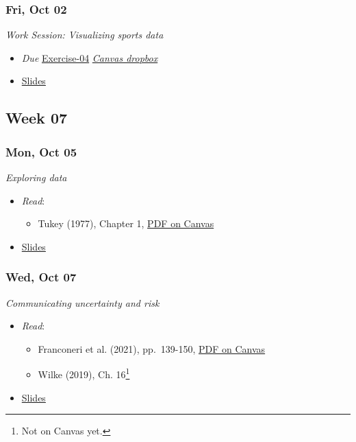 \documentclass[
  letterpaper,
  DIV=11,
  numbers=noendperiod]{scrartcl}
\providecommand{\tightlist}{%
  \setlength{\itemsep}{0pt}\setlength{\parskip}{0pt}}
\begin{document}
\subsubsection*{Fri, Oct 02}\label{fri-oct-02}

\emph{Work Session: Visualizing sports data}

\begin{itemize}
\tightlist
\item
   \emph{Due}
  \href{exercises/ex-04-making-figs-ggplot.qmd}{Exercise-04} \textbar{}
  \href{https://psu.instructure.com/courses/2484925/assignments/18448438}{
  \emph{Canvas dropbox}} \textbar{}
\item
  \href{404.qmd}{Slides}
\end{itemize}

\subsection*{Week 07}\label{week-07}

\subsubsection*{Mon, Oct 05}\label{mon-oct-05}

\emph{Exploring data}

\begin{itemize}
\tightlist
\item
  \emph{Read}:

  \begin{itemize}
  \tightlist
  \item
    Tukey (1977), Chapter 1,
    \href{https://psu.instructure.com/courses/2484925/files?preview=193922548}{PDF
    on Canvas}
  \end{itemize}
\item
  \href{404.qmd}{Slides}
\end{itemize}

\subsubsection*{Wed, Oct 07}\label{wed-oct-07}

\emph{Communicating uncertainty and risk}

\begin{itemize}
\tightlist
\item
  \emph{Read}:

  \begin{itemize}
  \tightlist
  \item
    Franconeri et al. (2021), pp.~139-150,
    \href{https://psu.instructure.com/courses/2484925/files?preview=193922618}{PDF
    on Canvas}
  \item
    Wilke (2019), Ch. 16\footnote{Not on Canvas yet.}
  \end{itemize}
\item
  \href{404.qmd}{Slides}
\end{itemize}
\end{document}
